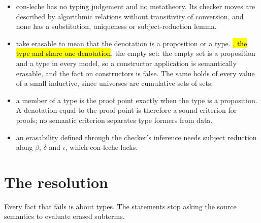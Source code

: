 \begin{itemize}
\item {} con-leche has no typing judgement and no metatheory. Its checker
  moves are described by algorithmic relations without transitivity of conversion, and none has a
  substitution, uniqueness or subject-reduction lemma.
\item {} take erasable to mean that the denotation is a proposition or
  a type. \hl{, the type  and  share one denotation},
  the empty set: the empty set is a proposition and a type in every model, so a constructor
  application is semantically erasable, and the fact on constructors is false. The same holds of
  every value of a small inductive, since universes are cumulative sets of sets.
\item {} a member of a type is the proof point exactly when the type is a
  proposition. A denotation equal to the proof point is therefore a sound criterion for proofs; no
  semantic criterion separates type formers from data.
\item {} an erasability defined through the checker's inference needs
  subject reduction along $\beta$, $\delta$ and $\iota$, which con-leche lacks.
\end{itemize}

\section{The resolution}\label{sec:resolution-marks}

Every fact that fails is about types. The statements stop asking the source semantics to evaluate
erased subterms.

